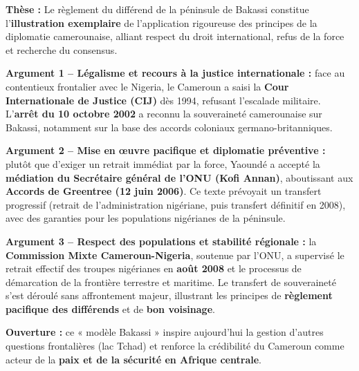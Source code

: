 \documentclass[11pt]{article}
\begin{document}
\begin{exemplebox}
\textbf{Thèse :} Le règlement du différend de la péninsule de Bakassi constitue l'\textbf{illustration exemplaire} de l'application rigoureuse des principes de la diplomatie camerounaise, alliant respect du droit international, refus de la force et recherche du consensus.

\textbf{Argument 1 -- Légalisme et recours à la justice internationale :} face au contentieux frontalier avec le Nigeria, le Cameroun a saisi la \textbf{Cour Internationale de Justice (CIJ)} dès 1994, refusant l'escalade militaire. L'\textbf{arrêt du 10 octobre 2002} a reconnu la souveraineté camerounaise sur Bakassi, notamment sur la base des accords coloniaux germano-britanniques.

\textbf{Argument 2 -- Mise en œuvre pacifique et diplomatie préventive :} plutôt que d'exiger un retrait immédiat par la force, Yaoundé a accepté la \textbf{médiation du Secrétaire général de l'ONU (Kofi Annan)}, aboutissant aux \textbf{Accords de Greentree (12 juin 2006)}. Ce texte prévoyait un transfert progressif (retrait de l'administration nigériane, puis transfert définitif en 2008), avec des garanties pour les populations nigérianes de la péninsule.

\textbf{Argument 3 -- Respect des populations et stabilité régionale :} la \textbf{Commission Mixte Cameroun-Nigeria}, soutenue par l'ONU, a supervisé le retrait effectif des troupes nigérianes en \textbf{août 2008} et le processus de démarcation de la frontière terrestre et maritime. Le transfert de souveraineté s'est déroulé sans affrontement majeur, illustrant les principes de \textbf{règlement pacifique des différends} et de \textbf{bon voisinage}.

\textbf{Ouverture :} ce « modèle Bakassi » inspire aujourd'hui la gestion d'autres questions frontalières (lac Tchad) et renforce la crédibilité du Cameroun comme acteur de la \textbf{paix et de la sécurité en Afrique centrale}.
\end{exemplebox}
\end{document}
